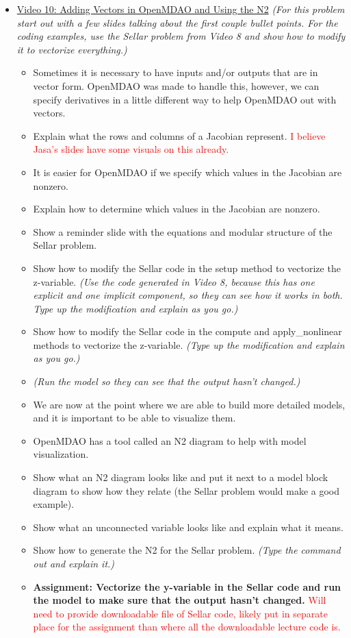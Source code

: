\documentclass[12pt, letterpaper]{article}
\begin{document}
\begin{itemize}
	\item \underline{Video 10: Adding Vectors in OpenMDAO and Using the N2} \textit{(For this problem start out with a few slides talking about the first couple bullet points. For the coding examples, use the Sellar problem from Video 8 and show how to modify it to vectorize everything.)}
		\begin{itemize}
			\item 	Sometimes it is necessary to have inputs and/or outputs that are in vector form. OpenMDAO was made to handle this, however, we can specify derivatives in a little different way to help OpenMDAO out with vectors.
			\item Explain what the rows and columns of a Jacobian represent. \textcolor{red}{I believe Jasa's slides have some visuals on this already.}
			\item It is easier for OpenMDAO if we specify which values in the Jacobian are nonzero.
			\item Explain how to determine which values in the Jacobian are nonzero.
			\item Show a reminder slide with the equations and modular structure of the Sellar problem.
			\item Show how to modify the Sellar code in the setup method to vectorize the z-variable. \textit{(Use the code generated in Video 8, because this has one explicit and one implicit component, so they can see how it works in both. Type up the modification and explain as you go.)}
			\item Show how to modify the Sellar code in the compute and apply\_nonlinear methods to vectorize the z-variable.  \textit{(Type up the modification and explain as you go.)}
			\item \textit{(Run the model so they can see that the output hasn’t changed.)}
			\item We are now at the point where we are able to build more detailed models, and it is important to be able to visualize them.
			\item OpenMDAO has a tool called an N2 diagram to help with model visualization.
			\item Show what an N2 diagram looks like and put it next to a model block diagram to show how they relate (the Sellar problem would make a good example).
			\item Show what an  unconnected variable looks like and explain what it means.
			\item Show how to generate the N2 for the Sellar problem. \textit{(Type the command out and explain it.)}
			\item \textbf{Assignment: Vectorize the y-variable in the Sellar code and run the model to make sure that the output hasn’t changed.} \textcolor{red}{Will need to provide downloadable file of Sellar code, likely put in separate place for the assignment than where all the downloadable lecture code is.}
		\end{itemize}


\end{itemize}
\end{document}
